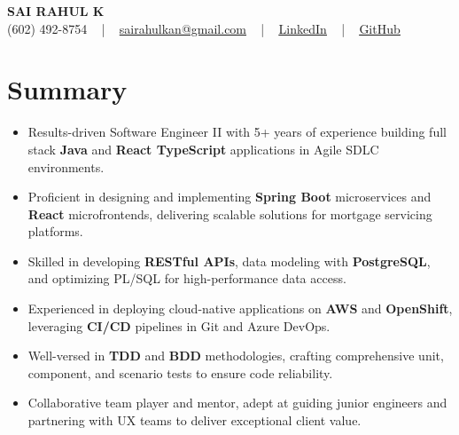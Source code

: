 \documentclass[letterpaper,11pt]{article}
\newcommand{\resumeItem}[1]{
  \item\footnotesize{
    {#1 \vspace{-2pt}}
  }
}
\newcommand{\resumeItemListStart}{\begin{itemize}[leftmargin=*]}
\newcommand{\resumeItemListEnd}{\end{itemize}\vspace{-5pt}}
\begin{document}
\begin{center}
    {\fontsize{14pt}{12pt}\selectfont \textbf{\MakeUppercase{Sai Rahul K}}}\\ \vspace{2pt}
    \fontsize{10pt}{12pt}\selectfont (602) 492-8754 ~ | ~ \href{mailto:sairahulkan@gmail.com}{sairahulkan@gmail.com} ~ | ~
    \href{https://www.linkedin.com/in/rq123/}{\color{blue}\underline{LinkedIn}} ~ | ~
    \href{https://github.com/kanrahuldo}{\color{blue}\underline{GitHub}}~
    \vspace{-8pt}
\end{center}

\section{Summary}
\fontsize{9pt}{10pt}\selectfont
\resumeItemListStart
    \resumeItem{Results-driven Software Engineer II with 5+ years of experience building full stack \textbf{Java} and \textbf{React TypeScript} applications in Agile SDLC environments.}
    \resumeItem{Proficient in designing and implementing \textbf{Spring Boot} microservices and \textbf{React} microfrontends, delivering scalable solutions for mortgage servicing platforms.}
    \resumeItem{Skilled in developing \textbf{RESTful APIs}, data modeling with \textbf{PostgreSQL}, and optimizing PL/SQL for high-performance data access.}
    \resumeItem{Experienced in deploying cloud-native applications on \textbf{AWS} and \textbf{OpenShift}, leveraging \textbf{CI/CD} pipelines in Git and Azure DevOps.}
    \resumeItem{Well-versed in \textbf{TDD} and \textbf{BDD} methodologies, crafting comprehensive unit, component, and scenario tests to ensure code reliability.}
    \resumeItem{Collaborative team player and mentor, adept at guiding junior engineers and partnering with UX teams to deliver exceptional client value.}
\resumeItemListEnd
\vspace{-6pt}
\end{document}
